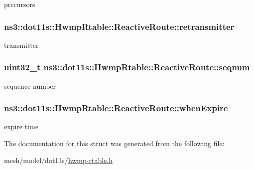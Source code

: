 precursors 

\subsubsection[{\texorpdfstring{retransmitter}{retransmitter}}]{ ns3\+::dot11s\+::\+Hwmp\+Rtable\+::\+Reactive\+Route\+::retransmitter}\hypertarget{structns3_1_1dot11s_1_1HwmpRtable_1_1ReactiveRoute_a4d147cace87b0f78028b77acc2e38162}{}\label{structns3_1_1dot11s_1_1HwmpRtable_1_1ReactiveRoute_a4d147cace87b0f78028b77acc2e38162}


transmitter 

\subsubsection[{\texorpdfstring{seqnum}{seqnum}}]{\setlength{\rightskip}{0pt plus 5cm}uint32\+\_\+t ns3\+::dot11s\+::\+Hwmp\+Rtable\+::\+Reactive\+Route\+::seqnum}\hypertarget{structns3_1_1dot11s_1_1HwmpRtable_1_1ReactiveRoute_ad1f0b941bbef9a89054c2e8c88c210fd}{}\label{structns3_1_1dot11s_1_1HwmpRtable_1_1ReactiveRoute_ad1f0b941bbef9a89054c2e8c88c210fd}


sequence number 

\subsubsection[{\texorpdfstring{when\+Expire}{whenExpire}}]{ ns3\+::dot11s\+::\+Hwmp\+Rtable\+::\+Reactive\+Route\+::when\+Expire}\hypertarget{structns3_1_1dot11s_1_1HwmpRtable_1_1ReactiveRoute_a48ebe06c74fcf3944b1b0bc714ea2c2a}{}\label{structns3_1_1dot11s_1_1HwmpRtable_1_1ReactiveRoute_a48ebe06c74fcf3944b1b0bc714ea2c2a}


expire time 



The documentation for this struct was generated from the following file\+:\begin{DoxyCompactItemize}
\item 
mesh/model/dot11s/\hyperlink{hwmp-rtable_8h}{hwmp-\/rtable.\+h}\end{DoxyCompactItemize}
